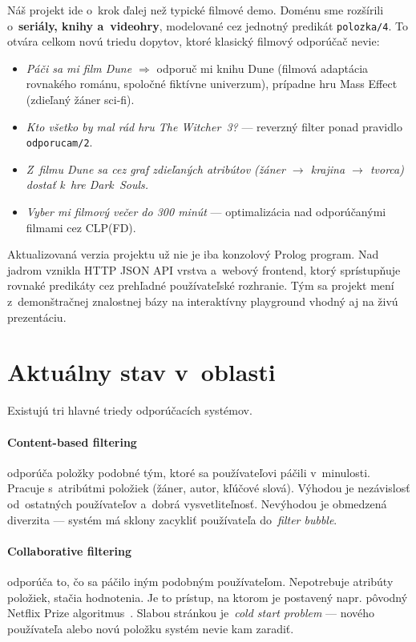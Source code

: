 \documentclass[11pt,a4paper]{article}
\begin{document}
Náš projekt ide o~krok ďalej než typické filmové demo. Doménu
sme rozšírili o~\textbf{seriály, knihy a~videohry}, modelované cez jednotný
predikát \texttt{polozka/4}. To otvára celkom novú triedu
dopytov, ktoré klasický filmový odporúčač nevie:

\begin{itemize}[noitemsep]
  \item \emph{Páči sa mi film Dune $\Rightarrow$} odporuč mi
        knihu Dune (filmová adaptácia rovnakého románu, spoločné
        fiktívne univerzum), prípadne hru Mass Effect (zdieľaný
        žáner sci-fi).
  \item \emph{Kto všetko by mal rád hru The Witcher~3?} ---
        reverzný filter ponad pravidlo \texttt{odporucam/2}.
  \item \emph{Z~filmu Dune sa cez graf zdieľaných atribútov
        (žáner $\to$ krajina $\to$ tvorca) dostať k~hre
        Dark~Souls.}
  \item \emph{Vyber mi filmový večer do 300 minút} ---
        optimalizácia nad odporúčanými filmami cez CLP(FD).
\end{itemize}

Aktualizovaná verzia projektu už nie je iba konzolový Prolog program.
Nad jadrom vznikla HTTP JSON API vrstva a~webový frontend, ktorý
sprístupňuje rovnaké predikáty cez prehľadné používateľské rozhranie.
Tým sa projekt mení z~demonštračnej znalostnej bázy na interaktívny
playground vhodný aj na živú prezentáciu.

\section{Aktuálny stav v~oblasti}

Existujú tri hlavné triedy odporúčacích systémov.

\paragraph{Content-based filtering} odporúča položky podobné
tým, ktoré sa používateľovi páčili v~minulosti. Pracuje
s~atribútmi položiek (žáner, autor, kľúčové slová). Výhodou
je nezávislosť od~ostatných používateľov a~dobrá
vysvetliteľnosť. Nevýhodou je obmedzená diverzita --- systém
má sklony zacykliť používateľa do~\emph{filter bubble}.

\paragraph{Collaborative filtering} odporúča to, čo sa páčilo
iným podobným používateľom. Nepotrebuje atribúty položiek, stačia
hodnotenia. Je to prístup, na ktorom je postavený napr. pôvodný
Netflix Prize algoritmus~\cite{aggarwal2016}. Slabou stránkou
je~\emph{cold start problem} --- nového používateľa alebo novú
položku systém nevie kam zaradiť.
\end{document}
